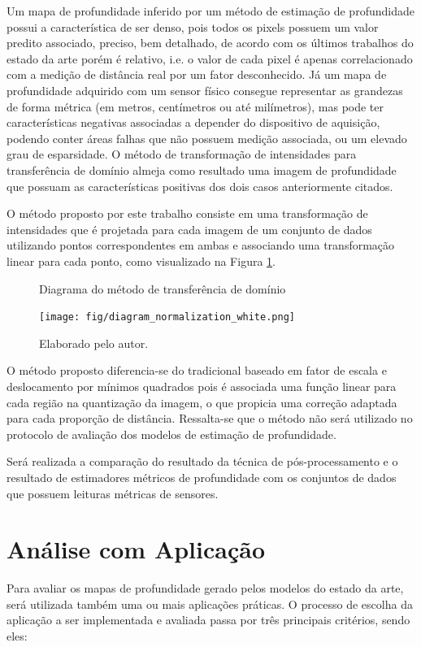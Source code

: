Um mapa de profundidade inferido por um método de estimação de profundidade possui a característica de ser denso, pois todos os pixels possuem um valor predito associado, preciso, bem detalhado, de acordo com os últimos trabalhos do estado da arte porém é relativo, i.e. o valor de cada pixel é apenas correlacionado com a medição de distância real por um fator desconhecido. Já um mapa de profundidade adquirido com um sensor físico consegue representar as grandezas de forma métrica (em metros, centímetros ou até milímetros), mas pode ter características negativas associadas a depender do dispositivo de aquisição, podendo conter áreas falhas que não possuem medição associada, ou um elevado grau de esparsidade. O método de transformação de intensidades para transferência de domínio almeja como resultado uma imagem de profundidade que possuam as características positivas dos dois casos anteriormente citados. 

O método proposto por este trabalho consiste em uma transformação de intensidades que é projetada para cada imagem de um conjunto de dados utilizando pontos correspondentes em ambas e associando uma transformação linear para cada ponto, como visualizado na Figura \ref{posproc}. 


\begin{figure}[h]
    \centering
    \caption{Diagrama do método de transferência de domínio}
    \texttt{[image: fig/diagram\_normalization\_white.png]}
    \caption*{Elaborado pelo autor.}
    \label{posproc}
\end{figure}

O método proposto diferencia-se do tradicional baseado em fator de escala e deslocamento por mínimos quadrados pois é associada uma função linear para cada região na quantização da imagem, o que propicia uma correção adaptada para cada proporção de distância. Ressalta-se que o método não será utilizado no protocolo de avaliação dos modelos de estimação de profundidade.

Será realizada a comparação do resultado da técnica de pós-processamento e o resultado de estimadores métricos de profundidade com os conjuntos de dados que possuem leituras métricas de sensores.


\section{Análise com Aplicação}

Para avaliar os mapas de profundidade gerado pelos modelos do estado da arte, será utilizada também uma ou mais aplicações práticas. O processo de escolha da aplicação a ser implementada e avaliada passa por três principais critérios, sendo eles: 

